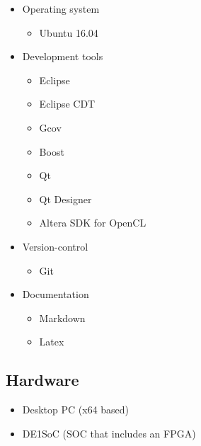 \documentclass[parskip=full]{scrartcl}
\begin{document}
\begin{itemize}
	\item Operating system
	\begin{itemize}
		\item Ubuntu 16.04
	\end{itemize}
	\item Development tools
	\begin{itemize}
		\item Eclipse
		\item Eclipse CDT
		\item Gcov
		\item Boost
		\item Qt
		\item Qt Designer
		\item Altera SDK for OpenCL
	\end{itemize}
	\item Version-control
	\begin{itemize}
		\item Git
	\end{itemize}
	\item Documentation
	\begin{itemize}
		\item Markdown
		\item Latex
	\end{itemize}
\end{itemize}

\subsection {Hardware}

\begin{itemize}
	\item Desktop PC (x64 based)
	\item DE1SoC (SOC that includes an FPGA)
\end{itemize}

\pagebreak
\end{document}
